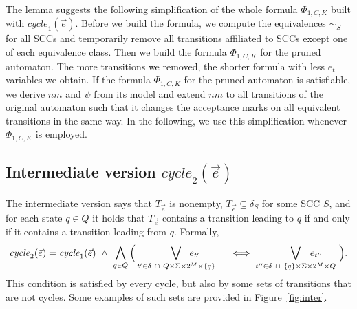 \documentclass[a4paper,UKenglish,cleveref,autoref,thm-restate]{lipics-v2021}
\newcommand{\rem}{\mathit{nm}}
\newcommand{\mcycle}{\mathit{cycle}}
\newcommand{\Te}{T_{\vec{e}}}
\begin{document}
The lemma suggests the following simplification of the whole formula
$\Phi_{1,C,K}$ built with $\mcycle_1(\vec{e})$. Before we build the
formula, we compute the equivalences $\sim_S$ for all SCCs and
temporarily remove all transitions affiliated to SCCs except one of
each equivalence class. Then we build the formula $\Phi_{1,C,K}$ for
the pruned automaton. The more transitions we removed, the shorter
formula with less $e_t$ variables we obtain. If the formula
$\Phi_{1,C,K}$ for the pruned automaton is satisfiable, we derive
$\rem$ and $\psi$ from its model and extend %
$\rem$ to all transitions of the original automaton such that
it changes the acceptance marks on all equivalent transitions in the
same way. In the following, we use this simplification whenever
$\Phi_{1,C,K}$ is employed.


\subsection{Intermediate version $\mcycle_2(\vec{e})$}
The intermediate version says that $\Te$ is nonempty,
$\Te\subseteq\delta_S$ for some SCC $S$, and for each state $q\in Q$
it holds that $\Te$ contains a transition leading to $q$ if and only
if it contains a transition leading from $q$. Formally,
\[
  \mcycle_2(\vec{e})=\mcycle_1(\vec{e})~\wedge~
  \bigwedge_{q\in Q}\Big(\bigvee_{t'\in\delta~\cap~Q\times\Sigma\times 2^M\times\{q\}}\hspace{-1cm}e_{t'}\hspace{1cm}\iff
  \bigvee_{t''\in\delta~\cap~\{q\}\times\Sigma\times 2^M\times Q}\hspace{-1cm}e_{t''}\hspace{6mm}\Big).
\]
This condition is satisfied by every cycle, but also by some sets of
transitions that are not cycles. Some examples of such sets are provided in Figure~\ref{fig:inter}.
\end{document}
